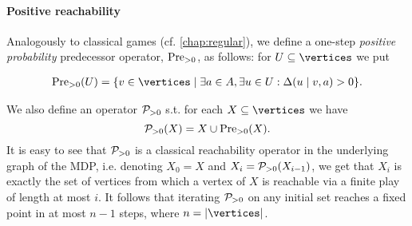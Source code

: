 

\paragraph{Positive reachability}  
Analogously to classical games (cf. \cref{chap:regular}), we define a one-step \emph{positive 
probability} predecessor 
operator, $\text{Pre}_{>0}$,
as follows: for $U\subseteq \vertices$ we put

\begin{align*}
\PrePos(U) &= \{v \in \vertices \mid \exists a \in \actions, \exists u \in U: 
\probTranFunc(u\mid v,a)>0 \}.\\
\end{align*}

\noindent
We also define an operator $\mathcal{P}_{>0}$ s.t. for each $X\subseteq\vertices$ we have
$$\mathcal{P}_{>0}(X) = X\cup \text{Pre}_{>0}(X).$$
It is easy to see that $\mathcal{P}_{>0}$ is a classical 
reachability operator in the underlying graph of the MDP, i.e. denoting $X_0 = 
X$ and $X_i = \mathcal{P}_{>0}(X_{i-1})$, we get that $X_i$ is exactly the set of 
vertices from which a vertex of $X$ is reachable via a finite play of length at 
most $i$. It follows that iterating $\mathcal{P}_{>0}$ on any initial set reaches a 
fixed point in at most $n-1$ steps, where $n=|\vertices|$.

